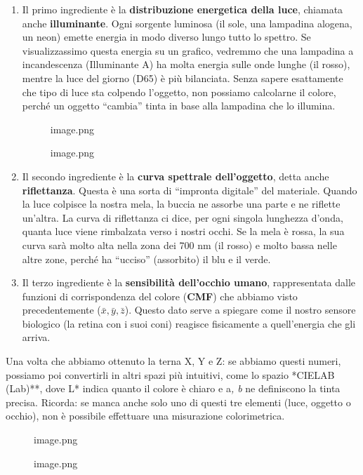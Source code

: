 \documentclass[
]{article}
\begin{document}
\begin{enumerate}
\def\labelenumi{\arabic{enumi}.}
\item
  Il primo ingrediente è la \textbf{distribuzione energetica della luce}, chiamata anche \textbf{illuminante}. Ogni sorgente luminosa (il sole, una lampadina alogena, un neon) emette energia in modo diverso lungo tutto lo spettro. Se visualizzassimo questa energia su un grafico, vedremmo che una lampadina a incandescenza (Illuminante A) ha molta energia sulle onde lunghe (il rosso), mentre la luce del giorno (D65) è più bilanciata. Senza sapere esattamente che tipo di luce sta colpendo l'oggetto, non possiamo calcolarne il colore, perché un oggetto ``cambia'' tinta in base alla lampadina che lo illumina.

  \begin{figure}
  \centering
  {image.png}
  \caption{image.png}
  \end{figure}
\item
  Il secondo ingrediente è la \textbf{curva spettrale dell'oggetto}, detta anche \textbf{riflettanza}. Questa è una sorta di ``impronta digitale'' del materiale. Quando la luce colpisce la nostra mela, la buccia ne assorbe una parte e ne riflette un'altra. La curva di riflettanza ci dice, per ogni singola lunghezza d'onda, quanta luce viene rimbalzata verso i nostri occhi. Se la mela è rossa, la sua curva sarà molto alta nella zona dei 700 nm (il rosso) e molto bassa nelle altre zone, perché ha ``ucciso'' (assorbito) il blu e il verde.
\item
  Il terzo ingrediente è la \textbf{sensibilità dell'occhio umano}, rappresentata dalle funzioni di corrispondenza del colore (\textbf{CMF}) che abbiamo visto precedentemente (\(\bar{x}, \bar{y}, \bar{z}\)). Questo dato serve a spiegare come il nostro sensore biologico (la retina con i suoi coni) reagisce fisicamente a quell'energia che gli arriva.
\end{enumerate}

Una volta che abbiamo ottenuto la terna X, Y e Z: se abbiamo questi numeri, possiamo poi convertirli in altri spazi più intuitivi, come lo spazio *CIELAB (Lab)**, dove L* indica quanto il colore è chiaro e a\emph{, b} ne definiscono la tinta precisa. Ricorda: se manca anche solo uno di questi tre elementi (luce, oggetto o occhio), non è possibile effettuare una misurazione colorimetrica.

\begin{figure}
\centering
{image.png}
\caption{image.png}
\end{figure}
\end{document}
